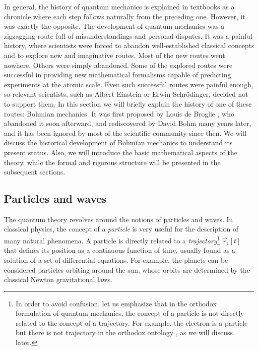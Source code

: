 \documentclass[nofootinbib, secnumarabic, amsmath, nobibnotes,11pt,aps,pra, floatfix]{revtex4-1}
\begin{document}
In general, the history of quantum mechanics is explained in
textbooks as a chronicle where each step follows naturally from the
preceding one. However, it was exactly the opposite. The
development of quantum mechanics was a zigzagging route full of
misunderstandings and personal disputes. It was a painful history, where scientists were
forced to abandon well-established classical concepts and to explore
new and imaginative routes. Most of the new routes went nowhere.
Others were simply abandoned. Some of the explored routes were
successful in providing new mathematical formalisms capable of
predicting experiments at the atomic scale. Even such successful
routes were painful enough, so relevant scientists, such as Albert
Einstein or Erwin Schr\"odinger, decided not to support them. In
this section we will briefly explain the history of one of these
routes: Bohmian mechanics. It was first proposed by Louis de Broglie
\cite{om.debroglie1923}, who abandoned it soon afterward, and
rediscovered by David Bohm \cite{om.bohm1952a,om.bohm1952b} many years
later, and it has been ignored by most of the scientific community
since then. We will discuss the historical development of
Bohmian mechanics to understand its present status. Also, we will
introduce the basic mathematical aspects of the theory, while the
formal and rigorous structure will be presented in the subsequent 
sections.

\subsection{Particles and waves}\label{om.sec_intro.1}

The quantum theory revolves around the notions of particles and waves.
In classical physics, the concept of a \textit{particle} is very
useful for the description of many natural phenomena. A particle is
directly related to a \textit{trajectory}\footnote{In order to avoid
confusion, let us emphasize that in the orthodox formulation of
quantum mechanics, the concept of a particle is not directly related
to the concept of a trajectory. For example, the electron is a
particle but there is not trajectory in the orthodox ontology , as we will discuss
later.} $\vec{r}_{i}[t]$ that defines its position as a continuous
function of time, usually found as a solution of a set of
differential equations. For example, the planets can be considered
particles orbiting around the sun, whose orbits are determined by
the classical Newton gravitational laws.
\end{document}
